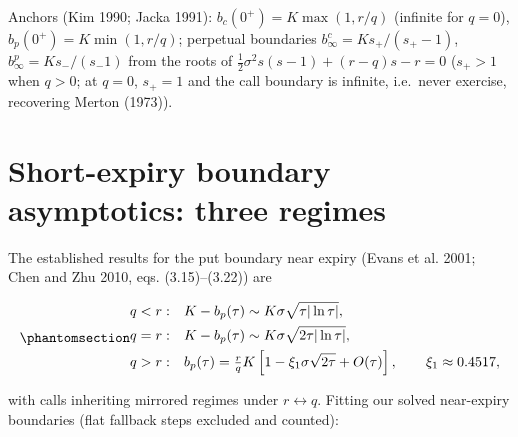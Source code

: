 \documentclass[
  english,
  10pt,
  letterpaper,
  DIV=11,
  numbers=noendperiod]{scrartcl}
\begin{document}
Anchors (Kim 1990; Jacka 1991): \(b_c(0^+)=K\max(1,r/q)\) (infinite for
\(q=0\)), \(b_p(0^+)=K\min(1,r/q)\); perpetual boundaries
\(b_\infty^c=K s_+/(s_+-1)\), \(b_\infty^p=K s_-/(s_-1)\) from the roots
of \(\frac12\sigma^2s(s-1)+(r-q)s-r=0\) (\(s_+>1\) when \(q>0\); at
\(q=0\), \(s_+=1\) and the call boundary is infinite, i.e.~never
exercise, recovering Merton (1973)).

\section{Short-expiry boundary asymptotics: three
regimes}\label{sec-asymptotics}

The established results for the put boundary near expiry (Evans et al.
2001; Chen and Zhu 2010, eqs. (3.15)--(3.22)) are

\begin{equation}\protect\phantomsection\label{eq-regimes}{
\begin{aligned}
q<r:&\quad K-b_p(\tau)\sim K\sigma\sqrt{\tau|\ln\tau|},\\
q=r:&\quad K-b_p(\tau)\sim K\sigma\sqrt{2\tau|\ln\tau|},\\
q>r:&\quad b_p(\tau)=\tfrac rq K\left[1-\xi_1\sigma\sqrt{2\tau}+O(\tau)\right],
\qquad \xi_1\approx0.4517,
\end{aligned}
}\end{equation}

with calls inheriting mirrored regimes under \(r\leftrightarrow q\).
Fitting our solved near-expiry boundaries (flat fallback steps excluded
and counted):
\end{document}
